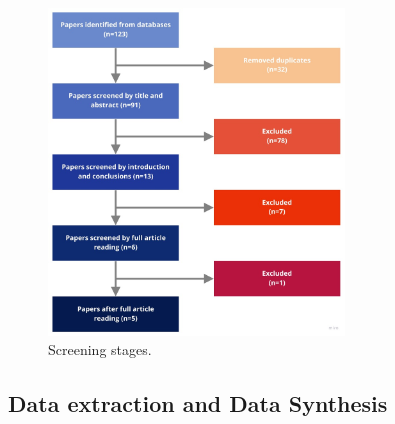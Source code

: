 
\begin{figure}[t]
  \begin{center}
    \leavevmode
    \includegraphics[width=0.7\textwidth]{figures/paper-screening.jpg}
    \caption{Screening stages.}
    \label{fig:/figures/paper-screening}
  \end{center}
\end{figure}

\subsection{Data extraction and Data Synthesis}


